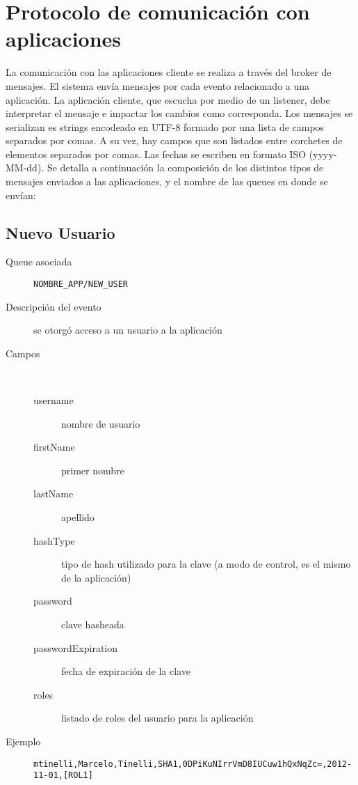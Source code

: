\section{Protocolo de comunicación con aplicaciones}

La comunicación con las aplicaciones cliente se realiza a través del broker de mensajes. El sistema envía mensajes
por cada evento relacionado a una aplicación. La aplicación cliente, que escucha por medio de un listener, debe
interpretar el mensaje e impactar los cambios como corresponda.
Los mensajes se serializan es strings encodeado en UTF-8 formado por una lista de campos separados
por comas. A su vez, hay campos que son listados entre corchetes de elementos separados por comas. Las fechas
se escriben en formato ISO (yyyy-MM-dd). Se detalla a continuación la composición de los distintos tipos
de mensajes enviados a las aplicaciones, y el nombre de las queues en donde se envían:

\subsection{Nuevo Usuario}
\begin{description}
  \item[Queue asociada] \texttt{NOMBRE\_APP/NEW\_USER}
  \item[Descripción del evento] se otorgó acceso a un usuario a la aplicación
  \item[Campos] \ 
    \begin{description}
      \item[username] nombre de usuario
      \item[firstName] primer nombre
      \item[lastName] apellido
      \item[hashType] tipo de hash utilizado para la clave (a modo de control, es el mismo de la aplicación)
      \item[password] clave hasheada
      \item[passwordExpiration] fecha de expiración de la clave
      \item[roles] listado de roles del usuario para la aplicación
    \end{description}
  \item[Ejemplo] \texttt{mtinelli,Marcelo,Tinelli,SHA1,0DPiKuNIrrVmD8IUCuw1hQxNqZc=,2012-11-01,[ROL1]}
\end{description}

